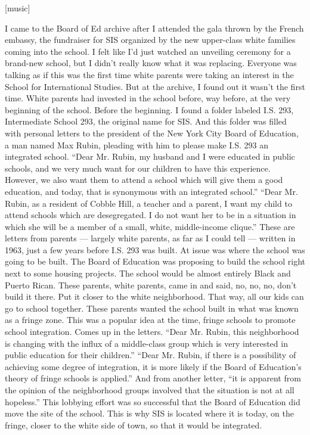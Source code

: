 {[}music{]}

I came to the Board of Ed archive after I attended the gala thrown by
the French embassy, the fundraiser for SIS organized by the new
upper-class white families coming into the school. I felt like I'd just
watched an unveiling ceremony for a brand-new school, but I didn't
really know what it was replacing. Everyone was talking as if this was
the first time white parents were taking an interest in the School for
International Studies. But at the archive, I found out it wasn't the
first time. White parents had invested in the school before, way before,
at the very beginning of the school. Before the beginning. I found a
folder labeled I.S. 293, Intermediate School 293, the original name for
SIS. And this folder was filled with personal letters to the president
of the New York City Board of Education, a man named Max Rubin, pleading
with him to please make I.S. 293 an integrated school. ``Dear Mr. Rubin,
my husband and I were educated in public schools, and we very much want
for our children to have this experience. However, we also want them to
attend a school which will give them a good education, and today, that
is synonymous with an integrated school.'' ``Dear Mr. Rubin, as a
resident of Cobble Hill, a teacher and a parent, I want my child to
attend schools which are desegregated. I do not want her to be in a
situation in which she will be a member of a small, white, middle-income
clique.'' These are letters from parents --- largely white parents, as
far as I could tell --- written in 1963, just a few years before I.S.
293 was built. At issue was where the school was going to be built. The
Board of Education was proposing to build the school right next to some
housing projects. The school would be almost entirely Black and Puerto
Rican. These parents, white parents, came in and said, no, no, no, don't
build it there. Put it closer to the white neighborhood. That way, all
our kids can go to school together. These parents wanted the school
built in what was known as a fringe zone. This was a popular idea at the
time, fringe schools to promote school integration. Comes up in the
letters. ``Dear Mr. Rubin, this neighborhood is changing with the influx
of a middle-class group which is very interested in public education for
their children.'' ``Dear Mr. Rubin, if there is a possibility of
achieving some degree of integration, it is more likely if the Board of
Education's theory of fringe schools is applied.'' And from another
letter, ``it is apparent from the opinion of the neighborhood groups
involved that the situation is not at all hopeless.'' This lobbying
effort was so successful that the Board of Education did move the site
of the school. This is why SIS is located where it is today, on the
fringe, closer to the white side of town, so that it would be
integrated.

